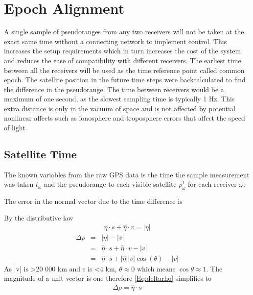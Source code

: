 
\section{Epoch Alignment}

A single sample of pseudoranges from any two receivers will not be taken at the exact same time without a connecting network to implement control. This increases the setup requirements which in turn increases the cost of the system and reduces the ease of compatibility with different receivers. The earliest time between all the receivers will be used as the time reference point called common epoch. The satellite position in the future time steps were backcalculated to find the difference in the pseudorange. The time between receivers would be a maximum of one second, as the slowest sampling time is typically 1 Hz. This extra distance is only in the vacuum of space and is not affected by potential nonlinear affects such as ionosphere and troposphere errors that affect the speed of light.\\

\subsection{Satellite Time}
The known variables from the raw GPS data is the time the sample measurement was taken $t_\omega$ and the pseudorange to each visible satellite $\rho_\omega^1$ for each receiver $\omega$.


The error in the normal vector due to the time difference is

By the distributive law
\begin{eqnarray}
\hat{\eta}\cdot s + \hat{\eta}\cdot v = |\eta| 
\end{eqnarray}
\begin{eqnarray}
\Delta \rho &=& |\eta| - |v|\\ %
&=& \hat{\eta}\cdot s + \hat{\eta}\cdot v - |v|\\
&=& \hat{\eta}\cdot s + |\hat{\eta}||v|\cos(\theta) - |v| \label{Eq:deltarho}
\end{eqnarray}
As |v| is >20 000 km and s is <4 km, $\theta\approx 0$ which means $\cos\theta\approx1$. The magnitude of a unit vector is one therefore \eqref{Eq:deltarho} simplifies to
\begin{eqnarray}
\Delta\rho = \hat{\eta}\cdot s 
\end{eqnarray}


